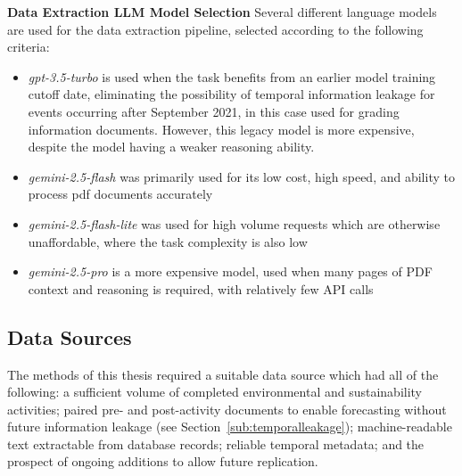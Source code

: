 \textbf{Data Extraction LLM Model Selection}
Several different language models are used for the data extraction pipeline, selected according to the following criteria:
\begin{itemize}
  \item \emph{gpt-3.5-turbo} is used when the task benefits from an earlier model training cutoff date, eliminating the possibility of temporal information leakage for events occurring after September 2021, in this case used for grading information documents. However, this legacy model is more expensive, despite the model having a weaker reasoning ability.
  \item \emph{gemini-2.5-flash} was primarily used for its low cost, high speed, and ability to process pdf documents accurately
  \item \emph{gemini-2.5-flash-lite} was used for high volume requests which are otherwise unaffordable, where the task complexity is also low
  \item \emph{gemini-2.5-pro} is a more expensive model, used when many pages of PDF context and reasoning is required, with relatively few API calls
\end{itemize}

\subsection{Data Sources} \label{sec:methods_for_LLM_forecasting}

The methods of this thesis required a suitable data source which had all of the following: a sufficient volume of completed environmental and sustainability activities; paired pre- and post-activity documents to enable forecasting without future information leakage (see Section~\ref{sub:temporalleakage}); machine-readable text extractable from database records; reliable temporal metadata; and the prospect of ongoing additions to allow future replication.

